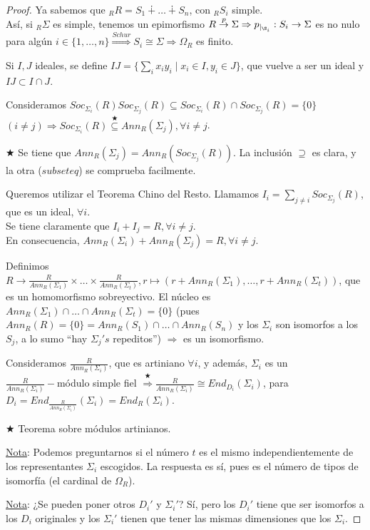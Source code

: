 \documentclass[11pt,a4paper]{article}
\theoremstyle{break}
\begin{document}
\begin{proof}
Ya sabemos que $_{R}R = S_{1} \dotplus \dots \dotplus S_{n}$, con $_{R}S_{i}$ simple. \\
Así, si $_{R}\Sigma$ es simple, tenemos un epimorfismo $R \overset{p}{\to} \Sigma \Rightarrow p_{\mid_{\S_{i}}}: S_{i} \to \Sigma$ es no nulo para algún $i \in \{1, \dots, n\} \overset{Schur}{\Rightarrow} S_{i} \cong \Sigma \Rightarrow \Omega_{R}$ es finito.

Si $I, J$ ideales, se define $IJ = \{\sum\limits_{i} x_{i}y_{i} \mid x_{i} \in I, y_{i} \in J\}$, que vuelve a ser un ideal y $IJ \subset I \cap J$.

Consideramos $Soc_{\Sigma_{i}}(R) Soc_{\Sigma_{j}}(R) \subseteq Soc_{\Sigma_{i}}(R) \cap Soc_{\Sigma_{j}}(R) = \{0\}$ \\
$(i \neq j) \Rightarrow Soc_{\Sigma_{i}}(R) \overset{\bigstar}{\subseteq} Ann_{R}(\Sigma_{j}), \forall i \neq j$.

$\bigstar$ Se tiene que $Ann_{R}(\Sigma_{j}) = Ann_{R}(Soc_{\Sigma_{j}}(R))$. La inclusión $\supseteq$ es clara, y la otra ($subseteq$) se comprueba facilmente.

Queremos utilizar el Teorema Chino del Resto. Llamamos $I_{i} = \sum\limits_{j \neq i} Soc_{\Sigma_{j}}(R)$, que es un ideal, $\forall i$. \\
Se tiene claramente que $I_{i} + I_{j} = R, \forall i \neq j$. \\
En consecuencia, $Ann_{R}(\Sigma_{i}) + Ann_{R}(\Sigma_{j}) = R, \forall i \neq j$.

Definimos $R \to \frac{R}{Ann_{R}(\Sigma_{1})} \times \dots \times \frac{R}{Ann_{R}(\Sigma_{t})}, r \mapsto (r + Ann_{R}(\Sigma_{1}), \dots, r + Ann_{R}(\Sigma_{t}))$, que es un homomorfismo sobreyectivo. El núcleo es $Ann_{R}(\Sigma_{1}) \cap \dots \cap Ann_{R}(\Sigma_{t}) = \{0\}$ (pues $Ann_{R}(R) = \{0\} = Ann_{R}(S_{1}) \cap \dots \cap Ann_{R}(S_{n})$ y los $\Sigma_{i}$ son isomorfos a los $S_{j}$, a lo sumo ``hay $\Sigma_{j}'s$ repeditos'') $\Rightarrow$ es un isomorfismo.

Consideramos $\frac{R}{Ann_{R}(\Sigma_{i})}$, que es artiniano $\forall i$, y además, $\Sigma_{i}$ es un \\ $\frac{R}{Ann_{R}(\Sigma_{i})}-$módulo simple fiel $\overset{\bigstar}{\Rightarrow} \frac{R}{Ann_{R}(\Sigma_{i})} \cong End_{D_{i}}(\Sigma_{i})$, para \\ $D_{i} = End_{\frac{R}{Ann_{R}(\Sigma_{i})}}(\Sigma_{i}) = End_{R}(\Sigma_{i})$.

$\bigstar$ Teorema sobre módulos artinianos.

\underline{Nota}: Podemos preguntarnos si el número $t$ es el mismo independientemente de los representantes $\Sigma_{i}$ escogidos. La respuesta es sí, pues es el número de tipos de isomorfía (el cardinal de $\Omega_{R}$).

\underline{Nota}: ¿Se pueden poner otros $D_{i}'$ y $\Sigma_{i}'$? Sí, pero los $D_{i}'$ tiene que ser isomorfos a los $D_{i}$ originales y los $\Sigma_{i}'$ tienen que tener las mismas dimensiones que los $\Sigma_{i}$.
\end{proof}
\end{document}
